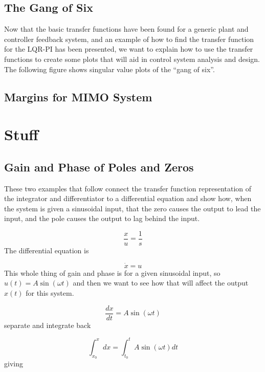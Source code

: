 \subsection{The Gang of Six}

Now that the basic transfer functions have been found for a generic plant and controller feedback system, and an example of how to find the transfer function for the LQR-PI has been presented, we want to explain how to use the transfer functions to create some plots that will aid in control system analysis and design.
The following figure shows singular value plots of the ``gang of six''.

\subsection{Margins for MIMO System}

\section{Stuff}

\subsection{Gain and Phase of Poles and Zeros}


These two examples that follow connect the transfer function representation of the integrator and differentiator to a differential equation and show how, when the system is given a sinusoidal input, that the zero causes the output to lead the input, and the pole causes the output to lag behind the input.

\begin{equation*}
  \frac{x}{u}=\frac{1}{s}
\end{equation*}
The differential equation is

\begin{equation*}
  \dot{x}=u
\end{equation*}
This whole thing of gain and phase is for a given sinusoidal input, so $u(t)=A\sin(\omega t)$ and then we want to see how that will affect the output $x(t)$ for this system.

\begin{equation*}
  \frac{dx}{dt}=A\sin(\omega t)
\end{equation*}
separate and integrate back

\begin{equation*}
  \int_{x_{0}}^{x} dx=\int_{t_{0}}^{t} A\sin(\omega t)dt
\end{equation*}
giving

